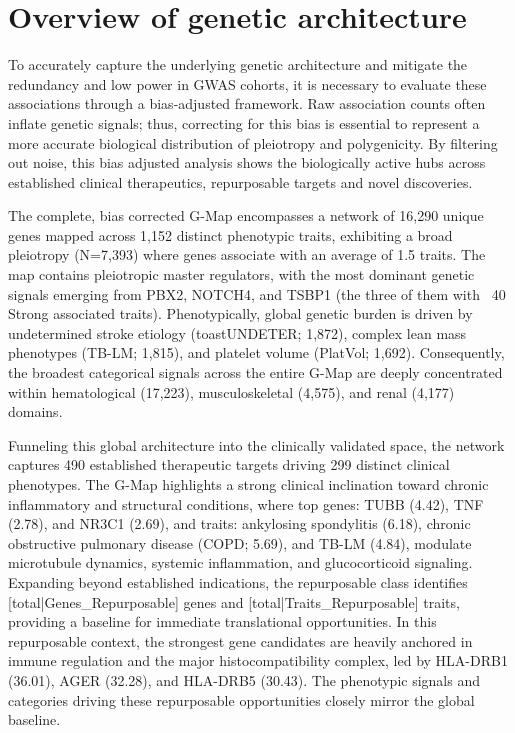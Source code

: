 \section{Overview of genetic architecture}
\label{sec:gen_arch}
To accurately capture the underlying genetic architecture and mitigate the redundancy and low power in GWAS cohorts, it is necessary to evaluate these associations through a bias-adjusted framework. Raw association counts often inflate genetic signals; thus, correcting for this bias is essential to represent a more accurate biological distribution of pleiotropy and polygenicity. By filtering out noise, this bias adjusted analysis shows the biologically active hubs across established clinical therapeutics, repurposable targets and novel discoveries.

The complete, bias corrected G-Map encompasses a network of 16,290 unique genes mapped across 1,152 distinct phenotypic traits, exhibiting a broad pleiotropy (N=7,393) where genes associate with an average of 1.5 traits. The map contains pleiotropic master regulators, with the most dominant genetic signals emerging from PBX2, NOTCH4, and TSBP1 (the three of them with ~40 Strong associated traits). Phenotypically, global genetic burden is driven by undetermined stroke etiology (toastUNDETER; 1,872), complex lean mass phenotypes (TB-LM; 1,815), and platelet volume (PlatVol; 1,692). Consequently, the broadest categorical signals across the entire G-Map are deeply concentrated within hematological (17,223), musculoskeletal (4,575), and renal (4,177) domains.

Funneling this global architecture into the clinically validated space, the network captures 490 established therapeutic targets driving 299 distinct clinical phenotypes. The G-Map highlights a strong clinical inclination toward chronic inflammatory and structural conditions, where top genes: TUBB (4.42), TNF (2.78), and NR3C1 (2.69), and traits: ankylosing spondylitis (6.18), chronic obstructive pulmonary disease (COPD; 5.69), and TB-LM (4.84), modulate microtubule dynamics, systemic inflammation, and glucocorticoid signaling. Expanding beyond established indications, the repurposable class identifies [total|Genes\_Repurposable] genes and [total|Traits\_Repurposable] traits, providing a baseline for immediate translational opportunities. In this repurposable context, the strongest gene candidates are heavily anchored in immune regulation and the major histocompatibility complex, led by HLA-DRB1 (36.01), AGER (32.28), and HLA-DRB5 (30.43). The phenotypic signals and categories driving these repurposable opportunities closely mirror the global baseline.

